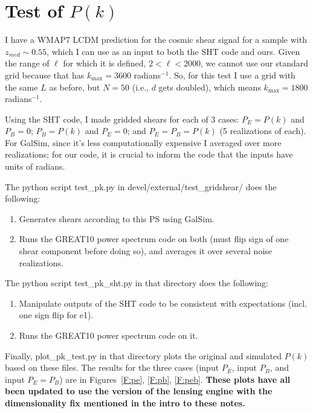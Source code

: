 \documentclass[preprint]{aastex}
\newcommand{\kmax}{\ensuremath{k_\mathrm{max}}}
\begin{document}
\section{Test of $P(k)$}\label{S:testpk}

I have a WMAP7 LCDM prediction for the cosmic shear signal for a
sample with $z_{med}\sim 0.55$, which I can use as an input to both
the SHT code and ours.  Given the range of $\ell$ for which it is
defined, $2<\ell<2000$, we cannot use our standard grid because that
has $\kmax=3600$ radians$^{-1}$.  So, for this test I use a grid with
the same $L$ as before, but $N=50$ (i.e., $d$ gets doubled), which
means $\kmax=1800$ radians$^{-1}$.

Using the SHT code, I made gridded shears for each of 3 cases:
$P_E=P(k)$ and $P_B=0$; $P_B=P(k)$ and $P_E=0$; and $P_E=P_B=P(k)$ (5
realizations of each).
For GalSim, since it's less computationally expensive I averaged over
more realizations; for our code, it is crucial to inform the code that
the inputs have units of radians.

The python script test\_pk.py in devel/external/test\_gridshear/ does the following:
\begin{enumerate}
\item Generates shears according to this PS using GalSim.
\item Runs the GREAT10 power spectrum code on both (must flip sign of
  one shear component before doing so), and averages it over several
  noise realizations.
\end{enumerate}

The python script test\_pk\_sht.py in that directory does the following:
\begin{enumerate}
\item Manipulate outputs of the SHT code to be consistent with
  expectations (incl. one sign flip for e1).
\item Runs the GREAT10 power spectrum code on it.
\end{enumerate}

Finally, plot\_pk\_test.py in that directory plots the original and
simulated $P(k)$ based on these files.  The results for the three
cases (input $P_E$, input $P_B$, and input $P_E=P_B$) are in
Figures~\ref{F:pe}, \ref{F:pb}, \ref{F:peb}.  \textbf{These plots have
  all been updated to use the version of the lensing engine with the
  dimensionality fix mentioned in the intro to these notes.}
\end{document}
